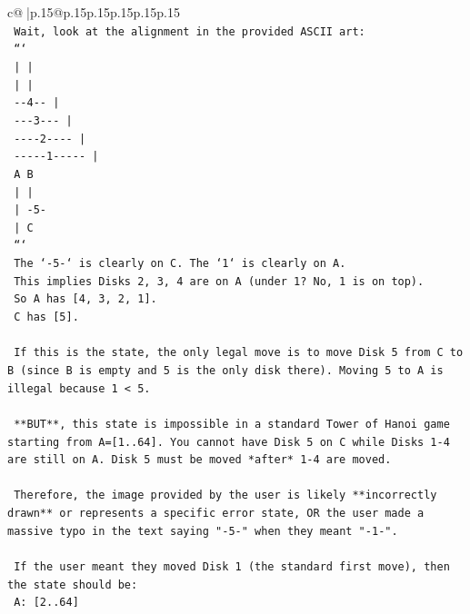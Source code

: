 \documentclass{article}
\begin{document}
{\begin{supertabular}{c@{$\;$}|p{.15\linewidth}@{}p{.15\linewidth}p{.15\linewidth}p{.15\linewidth}p{.15\linewidth}p{.15\linewidth}}
{{{\\ 
\texttt{    Wait, look at the alignment in the provided ASCII art:} \\
\texttt{    ```} \\
\texttt{          |           |} \\
\texttt{          |           |} \\
\texttt{        {-}{-}4{-}{-}         |} \\
\texttt{       {-}{-}{-}3{-}{-}{-}        |} \\
\texttt{      {-}{-}{-}{-}2{-}{-}{-}{-}       |} \\
\texttt{     {-}{-}{-}{-}{-}1{-}{-}{-}{-}{-}      |} \\
\texttt{          A           B} \\
\texttt{          |           |} \\
\texttt{          |          {-}5{-}} \\
\texttt{          |           C} \\
\texttt{    ```} \\
\texttt{    The `{-}5{-}` is clearly on C. The `1` is clearly on A.} \\
\texttt{    This implies Disks 2, 3, 4 are on A (under 1? No, 1 is on top).} \\
\texttt{    So A has {[}4, 3, 2, 1{]}.} \\
\texttt{    C has {[}5{]}.} \\
\\ 
\texttt{    If this is the state, the only legal move is to move Disk 5 from C to B (since B is empty and 5 is the only disk there). Moving 5 to A is illegal because 1 < 5.} \\
\\ 
\texttt{    **BUT**, this state is impossible in a standard Tower of Hanoi game starting from A={[}1..64{]}. You cannot have Disk 5 on C while Disks 1{-}4 are still on A. Disk 5 must be moved *after* 1{-}4 are moved.} \\
\\ 
\texttt{    Therefore, the image provided by the user is likely **incorrectly drawn** or represents a specific error state, OR the user made a massive typo in the text saying "{-}5{-}" when they meant "{-}1{-}".} \\
\\ 
\texttt{    If the user meant they moved Disk 1 (the standard first move), then the state should be:} \\
\texttt{    A: {[}2..64{]}} \\
}}}
\end{supertabular}}
\end{document}
